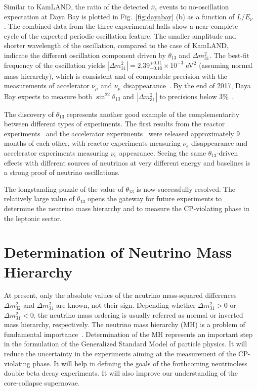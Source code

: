 \documentclass[aps,twocolumn,preprintnumbers,amsmath,superscriptaddress,amssymb,floats,nofootinbib]{revtex4-1}
\begin{document}
Similar to KamLAND, the ratio of the detected $\bar\nu_{e}$ events to no-oscillation expectation at Daya Bay is plotted in Fig.~\ref{fig:dayabay} (b) as a function of $L/E_{\nu}$. 
The combined data from the three experimental halls show a near-complete cycle of the expected periodic oscillation feature. 
The smaller amplitude and shorter wavelength of the oscillation, compared to the case of KamLAND, indicate the different oscillation component driven by $\theta_{13}$ and $\Delta{m}^2_{31}$. 
The best-fit frequency of the oscillation yields $|\Delta{m}^2_{31}| = 2.39^{+0.11}_{-0.10} \times 10^{-3}$ eV$^2$ (assuming normal mass hierarchy), which is consistent and of comparable precision with the measurements of accelerator $\nu_\mu$ and $\bar\nu_\mu$ disappearance~\cite{MINOS2014,T2K2014}. 
By the end of 2017, Daya Bay expects to measure both $\sin^22\theta_{13}$ and $|\Delta{m}^2_{31}|$ to precisions below 3\%~\cite{Zhang-Neutrino14}.

The discovery of $\theta_{13}$ represents another good example of the complementarity between different types of experiments. The first results from the reactor experiments~\cite{DChooz,Dayabay,Reno} and the accelerator experiments~\cite{T2K2011,MINOS2011} were released approximately 9 months of each other, with reactor experiments measuring $\bar\nu_e$ disappearance and accelerator experiments measuring $\nu_e$ appearance. Seeing the same $\theta_{13}$-driven effects with different sources 
of neutrinos at very different energy and baselines is a strong proof of neutrino oscillations.

The longstanding puzzle of the value of $\theta_{13}$ is now successfully resolved.
The relatively large value of $\theta_{13}$ opens the gateway for future experiments to determine the neutrino mass hierarchy and 
to measure the CP-violating phase in the leptonic sector.


\section{Determination of Neutrino Mass Hierarchy}

At present, only the absolute values of the neutrino mass-squared differences $\Delta m^2_{32}$ and $\Delta m^2_{31}$ are known, not their sign. 
Depending whether $\Delta m^2_{31}>0$ or $\Delta m^2_{31}<0$, the neutrino mass ordering is usually referred as normal or inverted mass hierarchy, respectively. 
The neutrino mass hierarchy (MH) is a problem of fundamental importance~\cite{MHwhitepaper}.
Determination of the MH represents an important step in the formulation of the Generalized Standard Model of particle physics. 
It will reduce the uncertainty in the experiments aiming at the measurement of the CP-violating phase. 
It will help in defining the goals of the forthcoming neutrinoless double beta decay experiments.
It will also improve our understanding of the core-collapse supernovae.
\end{document}

